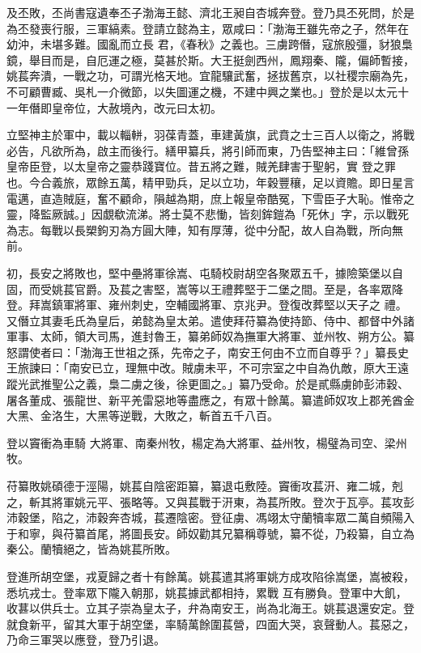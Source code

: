 \begin{pinyinscope}
 及丕敗，丕尚書寇遺奉丕子渤海王懿、濟北王昶自杏城奔登。登乃具丕死問，於是為丕發喪行服，三軍縞素。登請立懿為主，眾咸曰：「渤海王雖先帝之子，然年在幼沖，未堪多難。國亂而立長
 君，《春秋》之義也。三虜跨僭，寇旅殷彊，豺狼梟鏡，舉目而是，自厄運之極，莫甚於斯。大王挺劍西州，鳳翔秦、隴，偏師暫接，姚萇奔潰，一戰之功，可謂光格天地。宜龍驤武奮，拯拔舊京，以社稷宗廟為先，不可顧曹臧、吳札一介微節，以失圖運之機，不建中興之業也。」登於是以太元十一年僭即皇帝位，大赦境內，改元曰太初。



 立堅神主於軍中，載以輜軿，羽葆青蓋，車建黃旗，武賁之士三百人以衛之，將戰必告，凡欲所為，啟主而後行。繕甲纂兵，將引師而東，乃告堅神主曰：「維曾孫皇帝臣登，以太皇帝之靈恭踐寶位。昔五將之難，賊羌肆害于聖躬，實
 登之罪也。今合義旅，眾餘五萬，精甲勁兵，足以立功，年穀豐穰，足以資贍。即日星言電邁，直造賊庭，奮不顧命，隕越為期，庶上報皇帝酷冤，下雪臣子大恥。惟帝之靈，降監厥誠。」因覷欷流涕。將士莫不悲慟，皆刻鉾鎧為「死休」字，示以戰死為志。每戰以長槊鉤刃為方圓大陣，知有厚薄，從中分配，故人自為戰，所向無前。



 初，長安之將敗也，堅中壘將軍徐嵩、屯騎校尉胡空各聚眾五千，據險築堡以自固，而受姚萇官爵。及萇之害堅，嵩等以王禮葬堅于二堡之間。至是，各率眾降登。拜嵩鎮軍將軍、雍州刺史，空輔國將軍、京兆尹。登復改葬堅以天子之
 禮。又僭立其妻毛氏為皇后，弟懿為皇太弟。遣使拜苻纂為使持節、侍中、都督中外諸軍事、太師，領大司馬，進封魯王，纂弟師奴為撫軍大將軍、並州牧、朔方公。纂怒謂使者曰：「渤海王世祖之孫，先帝之子，南安王何由不立而自尊乎？」纂長史王旅諫曰：「南安已立，理無中改。賊虜未平，不可宗室之中自為仇敵，原大王遠蹤光武推聖公之義，梟二虜之後，徐更圖之。」纂乃受命。於是貳縣虜帥彭沛穀、屠各董成、張龍世、新平羌雷惡地等盡應之，有眾十餘萬。纂遣師奴攻上郡羌酋金大黑、金洛生，大黑等逆戰，大敗之，斬首五千八百。



 登以竇衝為車騎
 大將軍、南秦州牧，楊定為大將軍、益州牧，楊璧為司空、梁州牧。



 苻纂敗姚碩德于涇陽，姚萇自陰密距纂，纂退屯敷陸。竇衝攻萇汧、雍二城，剋之，斬其將軍姚元平、張略等。又與萇戰于汧東，為萇所敗。登次于瓦亭。萇攻彭沛穀堡，陷之，沛穀奔杏城，萇遷陰密。登征虜、馮翊太守蘭犢率眾二萬自頻陽入于和寧，與苻纂首尾，將圖長安。師奴勸其兄纂稱尊號，纂不從，乃殺纂，自立為秦公。蘭犢絕之，皆為姚萇所敗。



 登進所胡空堡，戎夏歸之者十有餘萬。姚萇遣其將軍姚方成攻陷徐嵩堡，嵩被殺，悉坑戎士。登率眾下隴入朝那，姚萇據武都相持，累戰
 互有勝負。登軍中大飢，收葚以供兵士。立其子崇為皇太子，弁為南安王，尚為北海王。姚萇退還安定。登就食新平，留其大軍于胡空堡，率騎萬餘圍萇營，四面大哭，哀聲動人。萇惡之，乃命三軍哭以應登，登乃引退。




\end{pinyinscope}
